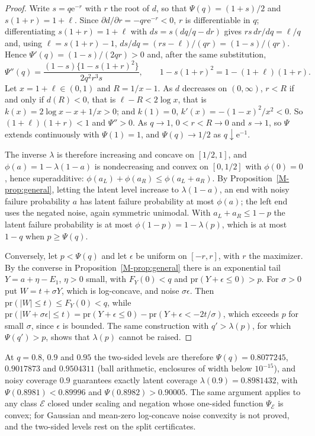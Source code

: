\documentclass[11pt]{article}
\renewcommand{\_}{\usc\allowbreak}
\newcommand{\pr}{\mathrm{pr}}
\begin{document}
\begin{proof}
Write $s = q \mathrm{e}^{-r}$ with $r$ the root of $d$, so that $\Psi(q) = (1 + s)/2$ and $s(1 + r) = 1 + \ell$. Since $\partial d/\partial r = -q r \mathrm{e}^{-r} < 0$, $r$ is differentiable in $q$; differentiating $s(1 + r) = 1 + \ell$ with $ds = s(dq/q - dr)$ gives $r s\,dr/dq = \ell/q$ and, using $\ell = s(1 + r) - 1$, $ds/dq = (rs - \ell)/(qr) = (1 - s)/(qr)$. Hence $\Psi'(q) = (1 - s)/(2qr) > 0$ and, after the same substitution,
\[
\Psi''(q) = \frac{(1 - s)\{1 - s(1 + r)^2\}}{2q^2 r^3 s}, \qquad 1 - s(1 + r)^2 = 1 - (1 + \ell)(1 + r).
\]
Let $x = 1 + \ell \in (0, 1)$ and $R = 1/x - 1$. As $d$ decreases on $(0, \infty)$, $r < R$ if and only if $d(R) < 0$, that is $\ell - R < 2\log x$, that is $k(x) = 2\log x - x + 1/x > 0$; and $k(1) = 0$, $k'(x) = -(1 - x)^2/x^2 < 0$. So $(1 + \ell)(1 + r) < 1$ and $\Psi'' > 0$. As $q \to 1$, $0 < r < R \to 0$ and $s \to 1$, so $\Psi$ extends continuously with $\Psi(1) = 1$, and $\Psi(q) \to 1/2$ as $q \downarrow \mathrm{e}^{-1}$.

The inverse $\lambda$ is therefore increasing and concave on $[1/2, 1]$, and $\phi(a) = 1 - \lambda(1 - a)$ is nondecreasing and convex on $[0, 1/2]$ with $\phi(0) = 0$, hence superadditive: $\phi(a_L) + \phi(a_R) \le \phi(a_L + a_R)$. By Proposition~\ref{M-prop:general}, letting the latent level increase to $\lambda(1 - a)$, an end with noisy failure probability $a$ has latent failure probability at most $\phi(a)$; the left end uses the negated noise, again symmetric unimodal. With $a_L + a_R \le 1 - p$ the latent failure probability is at most $\phi(1 - p) = 1 - \lambda(p)$, which is at most $1 - q$ when $p \ge \Psi(q)$.

Conversely, let $p < \Psi(q)$ and let $\epsilon$ be uniform on $[-r, r]$, with $r$ the maximizer. By the converse in Proposition~\ref{M-prop:general} there is an exponential tail $Y = a + \eta - E_1$, $\eta > 0$ small, with $F_Y(0) < q$ and $\pr(Y + \epsilon \le 0) > p$. For $\sigma > 0$ put $W = t + \sigma Y$, which is log-concave, and noise $\sigma\epsilon$. Then $\pr(|W| \le t) \le F_Y(0) < q$, while $\pr(|W + \sigma\epsilon| \le t) = \pr(Y + \epsilon \le 0) - \pr(Y + \epsilon < -2t/\sigma)$, which exceeds $p$ for small $\sigma$, since $\epsilon$ is bounded. The same construction with $q' > \lambda(p)$, for which $\Psi(q') > p$, shows that $\lambda(p)$ cannot be raised.
\end{proof}

At $q = 0.8$, $0.9$ and $0.95$ the two-sided levels are therefore $\Psi(q) = 0.8077245$, $0.9017873$ and $0.9504311$ (ball arithmetic, enclosures of width below $10^{-15}$), and noisy coverage $0.9$ guarantees exactly latent coverage $\lambda(0.9) = 0.8981432$, with $\Psi(0.8981) < 0.89996$ and $\Psi(0.8982) > 0.90005$. The same argument applies to any class $\mathcal E$ closed under scaling and negation whose one-sided function $\Psi_{\mathcal E}$ is convex; for Gaussian and mean-zero log-concave noise convexity is not proved, and the two-sided levels rest on the split certificates.
\end{document}
